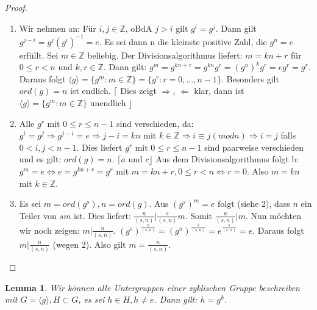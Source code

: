 \documentclass[12pt]{scrartcl}%
\newtheorem{lemma}{Lemma}
\theoremstyle{definition}
\theoremstyle{remark}
\begin{document}
\begin{proof}
	\begin{enumerate}
		\item Wir nehmen an: Für $i,j \in \mathbb{Z}$, oBdA $j>i$ gilt $g^{i}=g^{j}$. \newline Dann gilt $g^{j-i}=g^{j}(g^{i})^{-1}=e$. \newline Es sei dann n die kleinste positive Zahl, die $g^{n}=e$ erfüllt. Sei $m \in \mathbb{Z}$ beliebig. Der Divisionsalgorithmus liefert: $m=kn+r$ für $0 \leq r < n$ und $k,r \in \mathbb{Z}$. Dann gilt: \newline $g^{m}=g^{kn+r}=g^{kn}g^{r}=(g^{n})^{k}g^{r}=eg^{r}=g^{r}$. \newline Daraus folgt $\langle g \rangle = \lbrace g^{m} : m \in \mathbb{Z}\rbrace = \lbrace g^{r} : r=0,...,n-1\rbrace$. Besonders gilt $ord(g)=n$ ist endlich. \newline $\lceil$ Dies zeigt $\Rightarrow$, $\Leftarrow$ klar, dann ist $\langle g \rangle = \lbrace g^{m} : m \in \mathbb{Z}\rbrace$ unendlich $\rfloor$
		\item Alle $g^{r}$ mit $0 \leq r \leq n-1$ sind verschieden, da: \newline $g^{i}=g^{j} \Rightarrow g^{j-i}=e \Rightarrow j-i = kn$ mit $k \in \mathbb{Z} \Rightarrow i \equiv j (modn) \Rightarrow i=j$ falls $0<i,j<n-1$. \newline Dies liefert $g^{r}$ mit $0 \leq r \leq n-1$ sind paarweise verschieden und es gilt: \newline $ord(g)=n$. $\lceil a$ und $c\rfloor$ \newline Aus dem Divisionsalgorithmus folgt b: $g^{m}=e \Leftrightarrow e=g^{kn+r}=g^{r}$ mit $m = kn+r, 0 \leq r < n \Leftrightarrow r=0$. Also $m=kn$ mit $k \in \mathbb{Z}$.
		\item Es sei $m=ord(g^{s}), n =ord(g)$. Aus $(g^{s})^{m}=e$ folgt (siehe 2), dass $n$ ein Teiler von $sm$ ist. Dies liefert: $\frac{n}{(s,n)} \vert \frac{s}{(s,n)}m$. Somit $\frac{n}{(s,n)} \vert m$. \newline Nun möchten wir noch zeigen: $m \vert \frac{n}{(s,n)}$. $(g^{s})^{\frac{n}{(s,n)}} = (g^{n})^{\frac{s}{(s,n)}}=e^{\frac{s}{(s,n)}}=e$. Daraus folgt $m \vert \frac{n}{(s,n)}$ (wegen 2). \newline Also gilt $m = \frac{n}{(s,n)}$. 
	\end{enumerate}
\end{proof}

\begin{lemma}
	Wir können alle Untergruppen einer zyklischen Gruppe beschreiben mit $G = \langle g \rangle, H \subset G$, es sei $h \in H, h \neq e$. Dann gilt: $h = g^{k}$.
\end{lemma}
\end{document}
